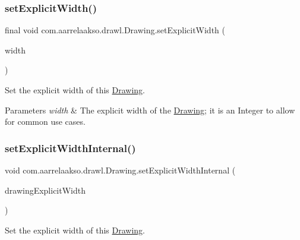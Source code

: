 \subsubsection{\texorpdfstring{set\+Explicit\+Width()}{setExplicitWidth()}\hspace{0.1cm}{\footnotesize\ttfamily [3/3]}}
{\footnotesize\ttfamily final void com.\+aarrelaakso.\+drawl.\+Drawing.\+set\+Explicit\+Width (\begin{DoxyParamCaption}\item[{final Integer}]{width }\end{DoxyParamCaption})}



Set the explicit width of this \hyperlink{classcom_1_1aarrelaakso_1_1drawl_1_1_drawing}{Drawing}. 


\begin{DoxyParams}{Parameters}
{\em width} & The explicit width of the \hyperlink{classcom_1_1aarrelaakso_1_1drawl_1_1_drawing}{Drawing}; it is an Integer to allow for common use cases. \\
\hline
\end{DoxyParams}
\mbox{\label{classcom_1_1aarrelaakso_1_1drawl_1_1_drawing_a7083d7046d42a99050495007854b5908}} 
\subsubsection{\texorpdfstring{set\+Explicit\+Width\+Internal()}{setExplicitWidthInternal()}}
{\footnotesize\ttfamily void com.\+aarrelaakso.\+drawl.\+Drawing.\+set\+Explicit\+Width\+Internal (\begin{DoxyParamCaption}\item[{@Not\+Null final \hyperlink{interfacecom_1_1aarrelaakso_1_1drawl_1_1_number}{Number}}]{drawing\+Explicit\+Width }\end{DoxyParamCaption})\hspace{0.3cm}{\ttfamily [private]}}



Set the explicit width of this \hyperlink{classcom_1_1aarrelaakso_1_1drawl_1_1_drawing}{Drawing}. 

